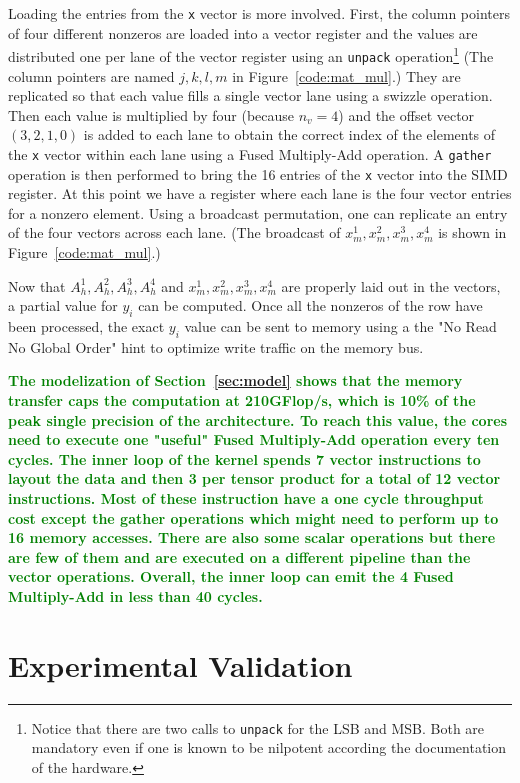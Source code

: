 \documentclass{sig-alternate}
\def\green#1{\textbf{\textcolor{green}{#1}}}
\def\ee#1{{\green{#1}}}
\begin{document}
Loading the entries from the {\tt x} vector is  more
involved. First, the column pointers of four different nonzeros are
loaded into a vector register and the values are distributed one per
lane of the vector register using an {\tt unpack}
operation\footnote{Notice that there are two calls to {\tt unpack} for the
LSB and MSB. Both are mandatory even if one is known to be
nilpotent according the documentation of the hardware.} (The column
pointers are named $j,k,l,m$ in Figure~\ref{code:mat_mul}.) They
are replicated so that each value fills a single vector lane 
using a swizzle operation. Then each value is multiplied by four
(because $n_v=4$) 
and the offset vector $(3,2,1,0)$ is added to each lane to obtain the
correct index of the elements of the {\tt x} vector within each lane
using a Fused Multiply-Add operation. A {\tt gather} operation is then
performed to bring the 16 entries of the {\tt x} vector into the SIMD
register. At this point we have a register where each lane is the
four vector entries for a nonzero element. Using a broadcast
permutation, one can replicate an entry of the four vectors across
each lane. (The broadcast of $x_m^1,x_m^2,x_m^3,x_m^4$ is shown in
Figure~\ref{code:mat_mul}.)

Now that $A_h^1,A_h^2,A_h^3,A_h^4$ and $x_m^1,x_m^2,x_m^3,x_m^4$ are
properly laid out in the vectors, a partial value for $y_i$ can be
computed. Once all the nonzeros of the row have been processed, the
exact $y_i$ value can be sent to memory using a the "No Read No Global
Order" hint to optimize write traffic on the memory bus.

\ee{The modelization of Section~\ref{sec:model} shows that the memory
  transfer caps the computation at 210GFlop/s, which is 10\% of the
  peak single precision of the architecture. To reach this value, the
  cores need to execute one "useful" Fused Multiply-Add operation
  every ten cycles. The inner loop of the kernel spends 7 vector
  instructions to layout the data and then 3 per tensor product for a
  total of 12 vector instructions. Most of these instruction have a
  one cycle throughput cost except the gather operations which might
  need to perform up to 16 memory accesses. There are also some scalar
  operations but there are few of them and are executed on a different
  pipeline than the vector operations. Overall, the inner loop can
  emit the 4 Fused Multiply-Add in less than 40 cycles.}

\section{Experimental Validation}
\label{sec:expe}
\end{document}
